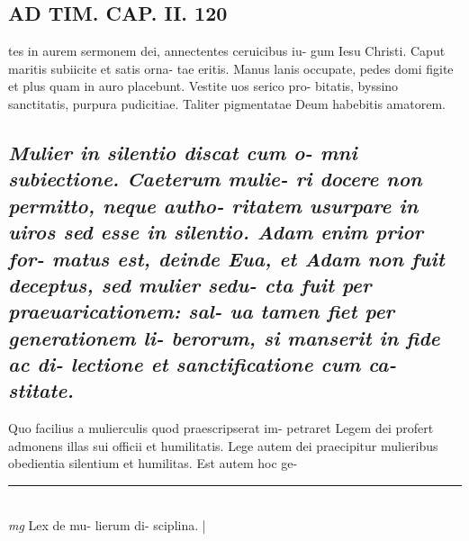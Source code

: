 \documentclass{article}
\begin{document}
\begin{pages}
\section*{AD TIM. CAP. II. 120 }\pstart tes in aurem sermonem dei, annectentes ceruicibus iu- gum Iesu Christi. Caput maritis subiicite et satis orna- tae eritis. Manus lanis occupate, pedes domi figite et plus quam in auro placebunt. Vestite uos serico pro- bitatis, byssino sanctitatis, purpura pudicitiae. Taliter pigmentatae Deum habebitis amatorem.  \pend
{}
{}
\subsection*{\textit{Mulier in silentio discat cum o- mni subiectione. Caeterum mulie- ri docere non permitto, neque autho- ritatem usurpare in uiros sed esse in silentio. Adam enim prior for- matus est, deinde Eua, et Adam non fuit deceptus, sed mulier sedu- cta fuit per praeuaricationem: sal- ua tamen fiet per generationem li- berorum, si manserit in fide ac di- lectione et sanctificatione cum ca- stitate. }}\pstart Quo facilius a mulierculis quod praescripserat im- petraret Legem dei profert admonens illas sui officii et humilitatis. Lege autem dei praecipitur mulieribus obedientia silentium et humilitas. Est autem hoc ge-  \pend
\vspace{0.5cm}\noindent
\vspace{0.2cm}\rule{1cm}{0.2pt}\\ 
\hspace{0.2cm}\textit{mg}
\footnotesize Lex de mu- lierum di- sciplina. 
\normalsize| 

\end{pages}
\end{document}
